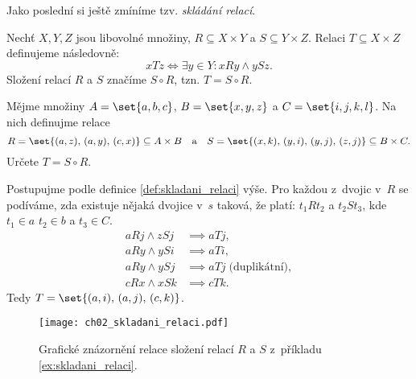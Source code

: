 Jako poslední si ještě zmíníme tzv. \emph{skládání relací}.
\begin{definition}\label{def:skladani_relaci}
    Nechť $X,Y,Z$ jsou libovolné množiny, $R\subseteq X\times Y$ a $S\subseteq Y\times Z$. Relaci $T\subseteq X\times Z$ definujeme následovně:
    \begin{equation*}
        xTz \iff \exists y\in Y : xRy \land ySz.
    \end{equation*}
    Složení relací $R$ a $S$ značíme $S\circ R$, tzn. $T=S\circ R$.
\end{definition}
\begin{example}\label{ex:skladani_relaci}
    Mějme množiny $A=\set{a,b,c}$, $B=\set{x,y,z}$ a $C=\set{i,j,k,l}$. Na nich definujme relace
    \begin{equation*}
        R=\set{(a,z),\,(a,y),\,(c,x)}\subseteq A\times B\quad\text{a}\quad S=\set{(x,k),\,(y,i),\,(y,j),\,(z,j)}\subseteq B\times C.
    \end{equation*}
    Určete $T=S\circ R$.
\end{example}
\begin{solution}
    Postupujme podle definice \ref{def:skladani_relaci} výše. Pro každou z~dvojic v~$R$ se podíváme, zda existuje nějaká dvojice v~$s$ taková, že platí: $t_1Rt_2$ a $t_2St_3$, kde $t_1\in a$ $t_2\in b$ a $t_3\in C$.
    \begin{align*}
        aRj \land zSj &\implies aTj,\\
        aRy \land ySi &\implies aTi,\\
        aRy \land ySj &\implies aTj\;\text{(duplikátní)},\\
        cRx \land xSk &\implies cTk.
    \end{align*}
    Tedy $T=\set{(a,i),\,(a,j),\,(c,k)}$.
\end{solution}
\begin{figure}[H]
    \centering
    \texttt{[image: ch02\_skladani\_relaci.pdf]}
    \caption{Grafické znázornění relace složení relací $R$ a $S$ z~příkladu \ref{ex:skladani_relaci}.}
    \label{fig:relace_mezi_mnozinami}
\end{figure}


